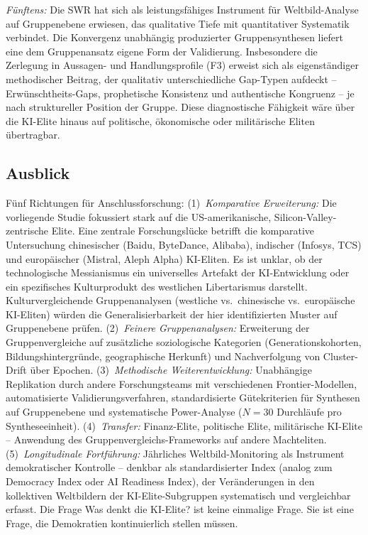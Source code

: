 \documentclass[12pt,a4paper]{article}
\begin{document}
\emph{F\"unftens:} Die SWR hat sich als leistungsf\"ahiges Instrument f\"ur Weltbild-Analyse auf Gruppenebene erwiesen, das qualitative Tiefe mit quantitativer Systematik verbindet. Die Konvergenz unabh\"angig produzierter Gruppensynthesen liefert eine dem Gruppenansatz eigene Form der Validierung. Insbesondere die Zerlegung in Aussagen- und Handlungsprofile (F3) erweist sich als eigenst\"andiger methodischer Beitrag, der qualitativ unterschiedliche Gap-Typen aufdeckt -- Erw\"unschtheits-Gaps, prophetische Konsistenz und authentische Kongruenz -- je nach struktureller Position der Gruppe. Diese diagnostische F\"ahigkeit w\"are \"uber die KI-Elite hinaus auf politische, \"okonomische oder milit\"arische Eliten \"ubertragbar.

\subsection{Ausblick}

F\"unf Richtungen f\"ur Anschlussforschung: (1)~\emph{Komparative Erweiterung:} Die vorliegende Studie fokussiert stark auf die US-amerikanische, Silicon-Valley-zentrische Elite. Eine zentrale Forschungsl\"ucke betrifft die komparative Untersuchung chinesischer (Baidu, ByteDance, Alibaba), indischer (Infosys, TCS) und europ\"aischer (Mistral, Aleph Alpha) KI-Eliten. Es ist unklar, ob der \glqq technologische Messianismus\grqq{} ein universelles Artefakt der KI-Entwicklung oder ein spezifisches Kulturprodukt des westlichen Libertarismus darstellt. Kulturvergleichende Gruppenanalysen (westliche vs.\ chinesische vs.\ europ\"aische KI-Eliten) w\"urden die Generalisierbarkeit der hier identifizierten Muster auf Gruppenebene pr\"ufen. (2)~\emph{Feinere Gruppenanalysen:} Erweiterung der Gruppenvergleiche auf zus\"atzliche soziologische Kategorien (Generationskohorten, Bildungshintergr\"unde, geographische Herkunft) und Nachverfolgung von Cluster-Drift \"uber Epochen. (3)~\emph{Methodische Weiterentwicklung:} Unabh\"angige Replikation durch andere Forschungsteams mit verschiedenen Frontier-Modellen, automatisierte Validierungsverfahren, standardisierte G\"utekriterien f\"ur Synthesen auf Gruppenebene und systematische Power-Analyse ($N = 30$ Durchl\"aufe pro Syntheseeinheit). (4)~\emph{Transfer:} Finanz-Elite, politische Elite, milit\"arische KI-Elite -- Anwendung des Gruppenvergleichs-Frameworks auf andere Machteliten. (5)~\emph{Longitudinale Fortf\"uhrung:} J\"ahrliches Weltbild-Monitoring als Instrument demokratischer Kontrolle -- denkbar als standardisierter Index (analog zum Democracy Index oder AI Readiness Index), der Ver\"anderungen in den kollektiven Weltbildern der KI-Elite-Subgruppen systematisch und vergleichbar erfasst. Die Frage \glqq Was denkt die KI-Elite?\grqq{} ist keine einmalige Frage. Sie ist eine Frage, die Demokratien kontinuierlich stellen m\"ussen.
\end{document}
